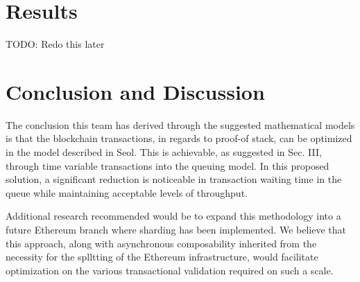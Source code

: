 \documentclass[conference]{IEEEtran}
\begin{document}
\section{Results}

TODO: Redo this later

\section{Conclusion and Discussion}

The conclusion this team has derived through the suggested mathematical models is that 
the blockchain transactions, in regards to proof-of stack, can be optimized in the model 
described in Seol\cite{2020_ACM_Seol}. This is achievable, as suggested in Sec. III, through 
time variable transactions into the queuing model. In this proposed solution, a significant 
reduction is noticeable in transaction waiting time in the queue while maintaining acceptable 
levels of throughput.

Additional research recommended would be to expand this methodology into a future 
Ethereum branch where sharding has been implemented. We believe that this approach, 
along with asynchronous composability inherited from the necessity for the splltting of the 
Ethereum infrastructure, would facilitate optimization on the various transactional validation 
required on such a scale.



\end{document}
